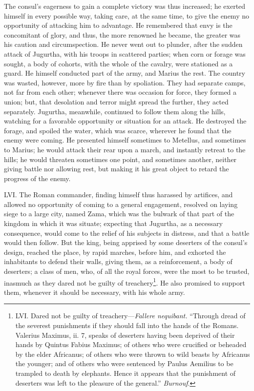 The consul's eagerness to gain a complete victory was thus increased;
he exerted himself in every possible way, taking care, at the same
time, to give the enemy no opportunity of attacking him to advantage.
He remembered that envy is the concomitant of glory, and thus, the
more renowned he became, the greater was his caution and
circumspection. He never went out to plunder, after the sudden attack
of Jugurtha, with his troops in scattered parties; when corn or forage
was sought, a body of cohorts, with the whole of the cavalry, were
stationed as a guard. He himself conducted part of the army, and
Marius the rest. The country was wasted, however, more by fire than by
spoliation. They had separate camps, not far from each other; whenever
there was occasion for force, they formed a union; but, that
desolation and terror might spread the further, they acted separately.
Jugurtha, meanwhile, continued to follow them along the hills,
watching for a favorable opportunity or situation for an attack. He
destroyed the forage, and spoiled the water, which was scarce,
wherever he found that the enemy were coming. He presented himself
sometimes to Metellus, and sometimes to Marius; he would attack their
rear upon a march, and instantly retreat to the hills; he would
threaten sometimes one point, and sometimes another, neither giving
battle nor allowing rest, but making it his great object to retard the
progress of the enemy.

LVI. The Roman commander, finding himself thus harassed by artifices,
and allowed no opportunity of coming to a general engagement, resolved
on laying siege to a large city, named Zama, which was the bulwark of
that part of the kingdom in which it was situate; expecting that
Jugurtha, as a necessary consequence, would come to the relief of his
subjects in distress, and that a battle would then follow. But the
king, being apprised by some deserters of the consul's design, reached
the place, by rapid marches, before him, and exhorted the inhabitants
to defend their walls, giving them, as a reinforcement, a body of
deserters; a class of men, who, of all the royal forces, were the most
to be trusted, inasmuch as they dared not be guilty of treachery\footnote{LVI. Dared not be guilty of treachery—\emph{Fallere nequibant.}
``Through dread of the severest punishments if they should fall into
the hands of the Romans. Valerius Maximus, ii. 7, speaks of deserters
having been deprived of their hands by Quintus Fabius Maximus; of
others who were crucified or beheaded by the elder Africanus; of
others who were thrown to wild beasts by Africanus the younger; and of
others who were sentenced by Paulus Aemilius to be trampled to death
by elephants. Hence it appears that the punishment of deserters was
left to the pleasure of the general.'' \emph{Burnouf}.}.
He also promised to support them, whenever it should be necessary,
with his whole army.

